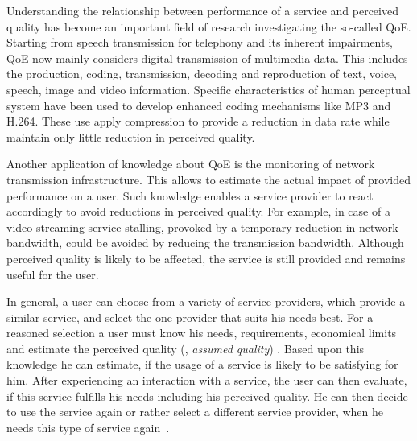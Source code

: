 Understanding the relationship between performance of a service and perceived quality has become an important field of research investigating the so-called \ac{QoE}.
Starting from speech transmission for telephony \citep[][]{licgee_ieee_1969} and its inherent impairments, \ac{QoE} now mainly considers digital transmission of multimedia data. %
This includes the production, coding, transmission, decoding and reproduction of text, voice, speech, image and video information.
Specific characteristics of human perceptual system have been used to develop enhanced coding mechanisms like \ac{MP3} and \ac{H.264}.
These use apply compression to provide a reduction in data rate while maintain only little reduction in perceived quality.

Another application of knowledge about \ac{QoE} is the monitoring of network transmission infrastructure.
This allows to estimate the actual impact of provided performance on a user.
Such knowledge enables a service provider to react accordingly to avoid reductions in perceived quality.
For example, in case of a video streaming service stalling, provoked by a temporary reduction in network bandwidth, could be avoided by reducing the transmission bandwidth.
Although perceived quality is likely to be affected, the service is still provided and remains useful for the user.

In general, a user can choose from a variety of service providers, which provide a similar service, and select the one provider that suits his needs best.
For a reasoned selection a user must know his needs, requirements, economical limits and estimate the perceived quality (\ie, \emph{assumed quality}) \citep[][p.~13]{raake_quality_2014}.
Based upon this knowledge he can estimate, if the usage of a service is likely to be satisfying for him.
After experiencing an interaction with a service, the user can then evaluate, if this service fulfills his needs including his perceived quality.
He can then decide to use the service again or rather select a different service provider, when he needs this type of service again~\citep[][]{geerts_linking_2010}.

